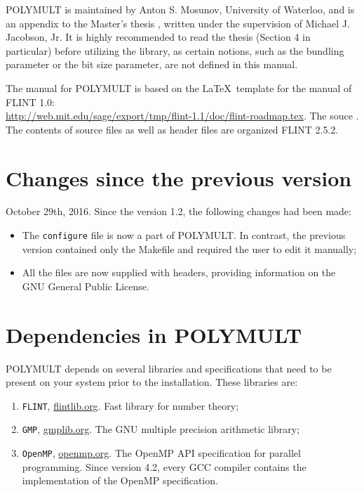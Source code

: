\documentclass[a4paper,10pt]{article}
\newcommand{\code}{\lstinline}
\begin{document}
POLYMULT is maintained by Anton S. Mosunov, University of Waterloo, and is an appendix to the Master's thesis \cite{mosunov}, written under the supervision of Michael J. Jacobson, Jr. It is highly recommended to read the thesis (Section 4 in particular) before utilizing the library, as certain notions, such as the bundling parameter or the bit size parameter, are not defined in this manual.

The manual for POLYMULT is based on the \LaTeX \, template for the manual of FLINT 1.0:\\\url{http://web.mit.edu/sage/export/tmp/flint-1.1/doc/flint-roadmap.tex}. The souce . The contents of source files as well as header files are organized FLINT 2.5.2.





\section{Changes since the previous version}

October 29th, 2016. Since the version 1.2, the following changes had been made:

\begin{itemize}
\item The \code{configure} file is now a part of POLYMULT. In contrast, the previous version contained only the Makefile and required the user to edit it manually;

\item All the files are now supplied with headers, providing information on the GNU General Public License.
\end{itemize}





\section{Dependencies in POLYMULT} \label{sec:dependencies}

POLYMULT depends on several libraries and specifications that need to be present on your system prior to the installation. These libraries are:

\begin{enumerate}
\item \code{FLINT}, \url{flintlib.org}. Fast library for number theory;
\item \code{GMP}, \url{gmplib.org}. The GNU multiple precision arithmetic library;
\item \code{OpenMP}, \url{openmp.org}. The OpenMP API specification for parallel programming. Since version 4.2, every GCC compiler contains the implementation of the OpenMP specification.
\end{enumerate}
\end{document}

